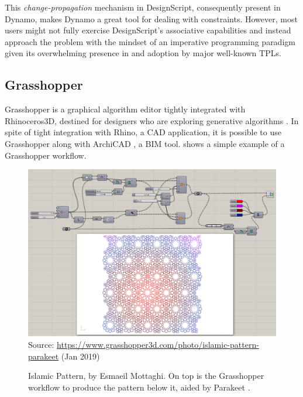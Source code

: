 This \textit{change-propagation} mechanism in DesignScript, consequently present
in Dynamo, makes Dynamo a great tool for dealing with constraints.  However,
most users might not fully exercise DesignScript's associative capabilities and
instead approach the problem with the mindset of an imperative programming
paradigm given its overwhelming presence in and adoption by major well-known
\acp{TPL}.

\subsection{Grasshopper}
\label{sec:related.ad.grasshopper}

Grasshopper is a graphical algorithm editor tightly integrated with
Rhinoceros3D, destined for designers who are exploring generative algorithms
\cite{Rutten:2018:Grasshopper}.  In spite of tight integration with Rhino, a
\ac{CAD} application, it is possible to use Grasshopper along with ArchiCAD
\cite{Graphisoft:2018:ArchiCAD,Graphisoft:2018:RGACAD}, a \ac{BIM} tool.
 shows a simple example of a
Grasshopper workflow.


\begin{figure}[htbp]
  \includegraphics[width=\textwidth]{fig/grasshopper-islamic-pattern}
  {\scriptsize
  Source: \url{https://www.grasshopper3d.com/photo/islamic-pattern-parakeet}
  (Jan 2019)}
  \caption[Islamic Pattern in Grasshopper using Parakeet]{
    Islamic Pattern, by Esmaeil Mottaghi.  On top is the Grasshopper workflow to
    produce the pattern below it, aided by Parakeet
    \cite{Esmaeil:2018:Parakeet}.}
  \label{fig:related.ad.grasshopper.islamic-pattern}
\end{figure}

